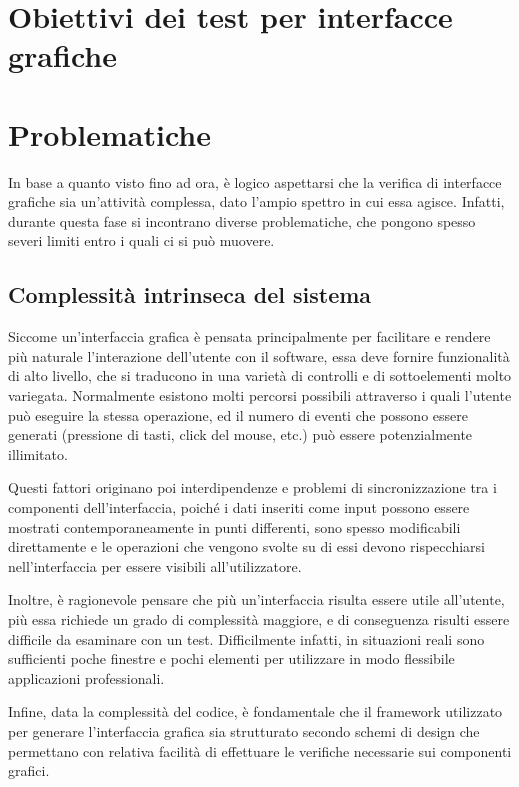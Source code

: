 \documentclass[12pt]{toptesi}
\begin{document}
\section{Obiettivi dei test per interfacce grafiche}

\section{Problematiche}

In base a quanto visto fino ad ora, è logico aspettarsi che la verifica di interfacce grafiche sia un'attività complessa, dato l'ampio spettro in cui essa agisce. %
Infatti, durante questa fase si incontrano diverse problematiche, che pongono spesso severi limiti entro i quali ci si può muovere.

\subsection{Complessità intrinseca del sistema}
Siccome un'interfaccia grafica è pensata principalmente per facilitare e rendere più naturale l'interazione dell'utente con il software, essa deve fornire funzionalità di alto livello, che si traducono in una varietà di controlli e di sottoelementi molto variegata. Normalmente esistono molti percorsi possibili attraverso i quali l'utente può eseguire la stessa operazione, ed il numero di eventi che possono essere generati (pressione di tasti, click del mouse, etc.) può essere potenzialmente illimitato.

Questi fattori originano poi interdipendenze e problemi di sincronizzazione tra i componenti dell'interfaccia, poiché i dati inseriti come input possono essere mostrati contemporaneamente in punti differenti, sono spesso modificabili direttamente e le operazioni che vengono svolte su di essi devono rispecchiarsi nell'interfaccia per essere visibili all'utilizzatore.

Inoltre, è ragionevole pensare che più un'interfaccia risulta essere utile all'utente, più essa richiede un grado di complessità maggiore, e di conseguenza risulti essere difficile da esaminare con un test. Difficilmente infatti, in situazioni reali sono sufficienti poche finestre e pochi elementi per utilizzare in modo flessibile applicazioni professionali. 

Infine, data la complessità del codice, è fondamentale che il framework utilizzato per generare l'interfaccia grafica sia strutturato secondo schemi di design che permettano con relativa facilità di effettuare le verifiche necessarie sui componenti grafici.
\end{document}
